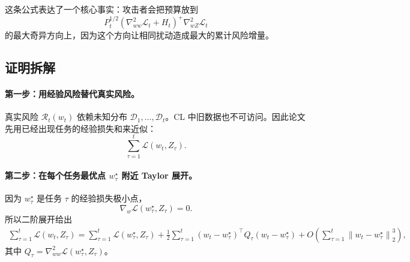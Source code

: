 \documentclass[UTF8,fontset=none,11pt]{ctexart}
\theoremstyle{cnstyle}
\newcommand{\calR}{\mathcal{R}}
\newcommand{\calL}{\mathcal{L}}
\newcommand{\calD}{\mathcal{D}}
\newcommand{\norm}[1]{\left\lVert #1\right\rVert}
\begin{document}
这条公式表达了一个核心事实：攻击者会把预算放到
\[
  P_t^{1/2}
  (\nabla_{ww}^2\calL_t+H_t)^+
  \nabla_{wZ}^2\calL_t
\]
的最大奇异方向上，因为这个方向让相同扰动造成最大的累计风险增量。

\subsection{证明拆解}

\paragraph{第一步：用经验风险替代真实风险。}
真实风险 \(\calR_t(w_t)\) 依赖未知分布 \(\calD_1,\dots,\calD_t\)。CL 中旧数据也不可访问。因此论文先用已经出现任务的经验损失和来近似：
\[
  \sum_{\tau=1}^t\calL(w_t,Z_\tau).
\]

\paragraph{第二步：在每个任务最优点 \(w_\tau^\star\) 附近 Taylor 展开。}
因为 \(w_\tau^\star\) 是任务 \(\tau\) 的经验损失极小点，
\[
  \nabla_w\calL(w_\tau^\star,Z_\tau)=0 .
\]
所以二阶展开给出
\begin{align}
  \sum_{\tau=1}^t\calL(w_t,Z_\tau)
  =
  \sum_{\tau=1}^t\calL(w_\tau^\star,Z_\tau)
  +\frac12\sum_{\tau=1}^t
  (w_t-w_\tau^\star)^\top Q_\tau(w_t-w_\tau^\star)
  +O\!\left(\sum_{\tau=1}^t\norm{w_t-w_\tau^\star}_2^3\right),
  \label{eq:taylor-risk}
\end{align}
其中 \(Q_\tau=\nabla_{ww}^2\calL(w_\tau^\star,Z_\tau)\)。
\end{document}
